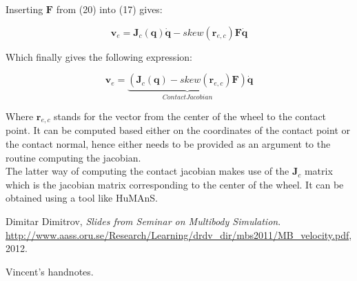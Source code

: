 \documentclass[a4paper]{article}
\begin{document}
\noindent Inserting $\boldsymbol{F}$ from (20) into (17) gives:

\begin{equation}
\boldsymbol{v}_{e} = \boldsymbol{J}_{c}(\boldsymbol{q})\boldsymbol{\dot{q}} - skew(\boldsymbol{r}_{e, c})\boldsymbol{F}\boldsymbol{\dot{q}}
\end{equation}

\noindent Which finally gives the following expression:

\begin{equation}
\boldsymbol{v}_{e} = \underbrace{(\boldsymbol{J}_{c}(\boldsymbol{q}) - skew(\boldsymbol{r}_{e, c})\boldsymbol{F})}_{Contact Jacobian}\boldsymbol{\dot{q}}
\end{equation}

\noindent Where $\boldsymbol{r}_{e, c}$ stands for the vector from the center of the wheel to the contact point. It can be computed based either on the coordinates of the contact point or the contact normal, hence either
needs to be provided as an argument to the routine computing the jacobian.\\

\noindent The latter way of computing the contact jacobian makes use of the $\boldsymbol{J}_{c}$ matrix which is the jacobian matrix corresponding to the center of the wheel. It can be obtained using a tool like HuMAnS.

\begin{thebibliography}{1}

 Dimitar Dimitrov, 
 \emph{Slides from Seminar on Multibody Simulation}.
 \url{http://www.aass.oru.se/Research/Learning/drdv_dir/mbs2011/MB_velocity.pdf},
 2012.

 Vincent's handnotes. 

\end{thebibliography}
\end{document}
